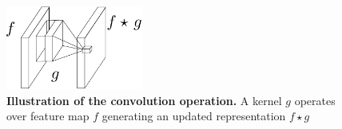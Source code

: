 \begin{figure}[H]
    \centering
    \includegraphics[width=0.4\textwidth]{fig/rel/images/conv_schema.pdf}
    \caption{\textbf{Illustration of the convolution operation.} A kernel $g$ operates over feature map $f$ 
             generating an updated representation $f\star g$ \autocite{lin2013network}}
    \label{fig:conv_local}
\end{figure}